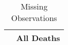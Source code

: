 \begin{table}[htbp]\centering
\def\sym#1{\ifmmode^{#1}\else\(^{#1}\)\fi}
\caption{Missing Observations}
\begin{tabular}{l*{1}{c}}
\hline\hline
            &  All Deaths\\
\hline
\hline\hline
\end{tabular}
\end{table}
